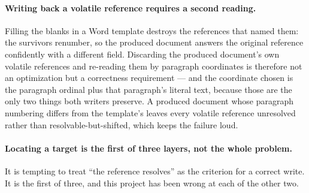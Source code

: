 \paragraph{Writing back a volatile reference requires a second reading.}
Filling the blanks in a Word template destroys the references that named them: the survivors
renumber, so the produced document answers the original reference confidently with a different
field. Discarding the produced document's own volatile references and re-reading them by
paragraph coordinates is therefore not an optimization but a correctness requirement --- and
the coordinate chosen is the paragraph ordinal plus that paragraph's literal text, because
those are the only two things both writers preserve. A produced document whose paragraph
numbering differs from the template's leaves every volatile reference unresolved rather than
resolvable-but-shifted, which keeps the failure loud.

\paragraph{Locating a target is the first of three layers, not the whole problem.}
It is tempting to treat ``the reference resolves'' as the criterion for a correct write. It is
the first of three, and this project has been wrong at each of the other two.

